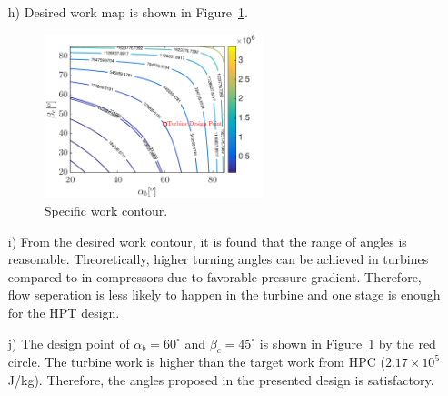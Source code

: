 \documentclass[12pt]{article}
\begin{document}
\begin{itemize}
	\item[h)]
	Desired work map is shown in Figure~\ref{fig:p2h}.
	\begin{figure}[H]
		\centering
		\includegraphics[width=0.6\textwidth]{p2h}
		\caption{Specific work contour.}
		\label{fig:p2h}
	\end{figure}
	
	\item[i)]
	From the desired work contour, it is found that the range of angles is reasonable. Theoretically, higher turning angles can be achieved in turbines compared to in compressors due to favorable pressure gradient. Therefore, flow seperation is less likely to happen in the turbine and one stage is enough for the HPT design.
	
	\item[j)]
	The design point of $\alpha_b = 60^\circ$ and $\beta_c = 45^\circ$ is shown in Figure~\ref{fig:p2h} by the red circle. The turbine work is higher than the target work from HPC ($2.17\times 10^5$ J/kg). Therefore, the angles proposed in the presented design is satisfactory.
	
\end{itemize}

\end{document}
